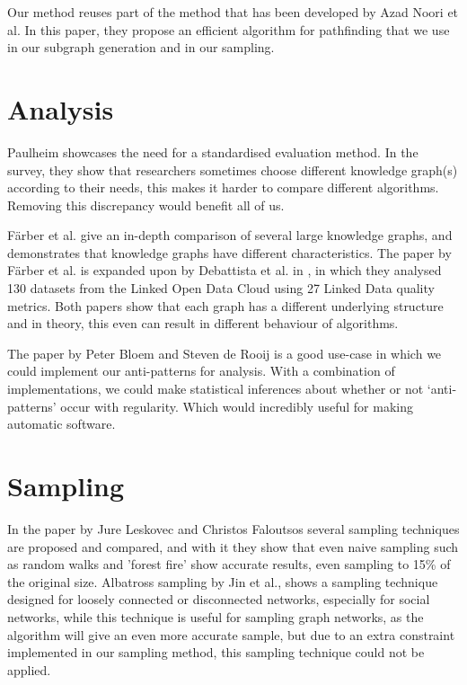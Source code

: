 \documentclass[11pt,letterpaper ,oneside ]{book}
\begin{document}
	Our method reuses part of the method that has been developed by Azad Noori et al\cite{Noori:2015}. In this paper, they propose an efficient algorithm for pathfinding that we use in our subgraph generation and in our sampling.
	
	\section{Analysis}
	Paulheim \cite{HeikoP:2016} showcases the need for a standardised evaluation method. In the survey, they show that researchers sometimes choose different knowledge graph(s) according to their needs, this makes it harder to compare different algorithms. Removing this discrepancy would benefit all of us.
	
	F\"arber et al. \cite{MichaelF:2017} give an in-depth comparison of several large knowledge graphs, and demonstrates that knowledge graphs have different characteristics. The paper by F\"arber et al. \cite{MichaelF:2017} is expanded upon by Debattista et al. in \cite{Debattista:2018}, in which they analysed 130 datasets from the Linked Open Data Cloud using 27 Linked Data quality metrics. Both papers show that each graph has a different underlying structure and in theory, this even can result in different behaviour of algorithms.
	
	The paper by Peter Bloem and Steven de Rooij\cite{BloemP:2018} is a good use-case in which we could implement our anti-patterns for analysis. With a combination of implementations, we could make statistical inferences about whether or not `anti-patterns' occur with regularity. Which would incredibly useful for making automatic software.
	
	\section{Sampling}
	In the paper by Jure Leskovec and Christos Faloutsos \cite{Leskovec:2006} several sampling techniques are proposed and compared, and with it they show that even naive sampling such as random walks and 'forest fire' show accurate results, even sampling to 15\% of the original size. 
	Albatross sampling by Jin et al.\cite{Jin:2011}, shows a sampling technique designed for loosely connected or disconnected networks, especially for social networks, while this technique is useful for sampling graph networks, as the algorithm will give an even more accurate sample, but due to an extra constraint implemented in our sampling method, this sampling technique could not be applied.
	
\end{document}
